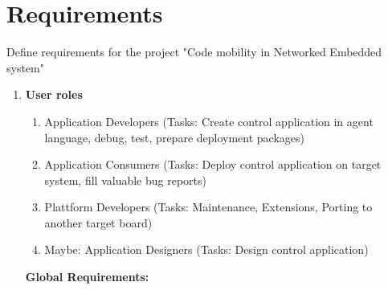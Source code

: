 \documentclass{scrreprt}
\begin{document}

\chapter{Requirements}	

Define requirements for the project "Code mobility in Networked Embedded system"

\renewcommand{\labelenumi}{\arabic{enumi}}
\renewcommand{\labelenumii}{\arabic{enumi}.\arabic{enumii}}

\begin{enumerate}

\item\textbf{User roles}
\begin{enumerate}

\item Application Developers (Tasks: Create control application in agent language, debug, test, prepare deployment packages)
\item Application Consumers  (Tasks: Deploy control application on target system, fill valuable bug reports)
\item Plattform Developers (Tasks: Maintenance, Extensions, Porting to another target board)
\item Maybe: Application Designers (Tasks: Design control application)
\end{enumerate}


\textbf{
Global Requirements:
}



\end{enumerate}
\end{document}
